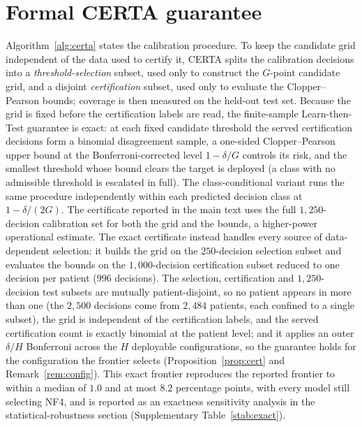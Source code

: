 \documentclass[11pt]{article}
\theoremstyle{plain}
\begin{document}
\section{Formal CERTA guarantee}
Algorithm~\ref{alg:certa} states the calibration procedure. To keep the candidate grid independent of
the data used to certify it, CERTA splits the calibration decisions into a \emph{threshold-selection}
subset, used only to construct the $G$-point candidate grid, and a disjoint \emph{certification} subset,
used only to evaluate the Clopper--Pearson bounds; coverage is then measured on the held-out test set.
Because the grid is fixed before the certification labels are read, the finite-sample Learn-then-Test
guarantee is exact: at each fixed candidate threshold the served certification decisions form a binomial
disagreement sample, a one-sided Clopper--Pearson upper bound at the Bonferroni-corrected level
$1-\delta/G$ controls its risk, and the smallest threshold whose bound clears the target is deployed (a
class with no admissible threshold is escalated in full). The class-conditional variant runs the same
procedure independently within each predicted decision class at $1-\delta/(2G)$. The certificate reported
in the main text uses the full $1{,}250$-decision calibration set for both the grid and the bounds, a
higher-power operational estimate. The exact certificate instead handles every source of data-dependent
selection: it builds the grid on the $250$-decision selection subset and evaluates the bounds on the
$1{,}000$-decision certification subset reduced to one decision per patient ($996$ decisions). The selection,
certification and $1{,}250$-decision test subsets are mutually patient-disjoint, so no patient appears in more
than one (the $2{,}500$ decisions come from $2{,}484$ patients, each confined to a single subset), the grid is
independent of the certification labels, and the served certification count is exactly binomial at the patient level; and it applies an outer $\delta/H$ Bonferroni across the $H$ deployable
configurations, so the guarantee holds for the configuration the frontier selects
(Proposition~\ref{prop:cert} and Remark~\ref{rem:config}). This exact frontier reproduces the reported
frontier to within a median of $1.0$ and at most $8.2$ percentage points, with every model still selecting
NF4, and is reported as an exactness sensitivity analysis in the statistical-robustness section
(Supplementary Table~\ref{stab:exact}).
\end{document}
